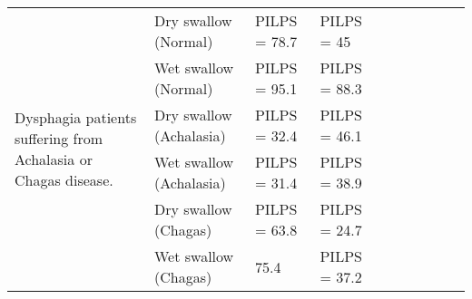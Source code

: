 \begin{landscape}
{\begin{longtable}{llllllllll}
\multirow{6}{*}{Dysphagia patients suffering from Achalasia or Chagas disease.}                                                                                                                                                                                                                 & Dry swallow (Normal)                    & PILPS = 78.7                                                      & PILPS = 45                                                    &          &                                                                 &          \\
& Wet swallow (Normal)                   & PILPS = 95.1                                                      & PILPS = 88.3                                                  &          &                                                                 &          \\
& Dry swallow (Achalasia)       & PILPS = 32.4                                                      & PILPS = 46.1                                                  &          &                                                                 &          \cite{dalmazo2010esophageal}\\
& Wet swallow (Achalasia)               & PILPS = 31.4                                                      & PILPS = 38.9                                                  &          &                                                                 &          \\
& Dry swallow (Chagas)                  & PILPS = 63.8                                                      & PILPS = 24.7                                                  &          &                                                                 &          \\
& Wet swallow (Chagas)             & 75.4                                                      & PILPS = 37.2                                                  &          &                                                                 & \\
\midrule



\end{longtable}}
\end{landscape}
